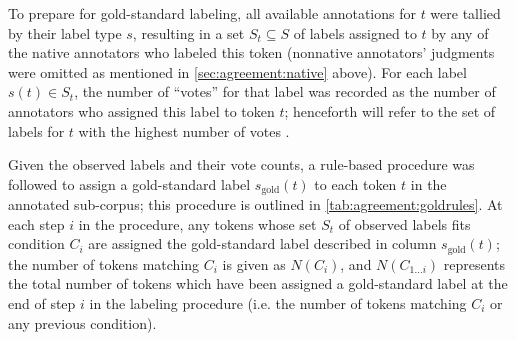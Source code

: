		To prepare for gold-standard labeling, all available annotations for $t$ were tallied by their label type $s$, resulting in a set $S_t \subseteq S$ of labels assigned to $t$ by any of the native annotators who labeled this token (nonnative annotators' judgments were omitted as mentioned in \cref{sec:agreement:native} above). For each label $s(t) \in S_t$, the number of ``votes'' for that label was recorded as the number of annotators who assigned this label to token $t$; henceforth  will refer to the set of labels for $t$ with the highest number of votes .
		
		Given the observed labels and their vote counts, a rule-based procedure was followed to assign a gold-standard label $s_{\text{gold}}(t)$ to each token $t$ in the annotated sub-corpus; this procedure is outlined in \cref{tab:agreement:goldrules}. At each step $i$ in the procedure, any tokens whose set $S_t$ of observed labels fits condition $C_i$ are assigned the gold-standard label described in column $s_{\text{gold}}(t)$; the number of tokens matching $C_i$ is given as $N(C_i)$, and 
		$N(C_{1 \dots i})$ represents the total number of tokens which have been assigned a gold-standard label at the end of step $i$ in the labeling procedure (i.e. the number of tokens matching $C_i$ or any previous condition).
		
		

